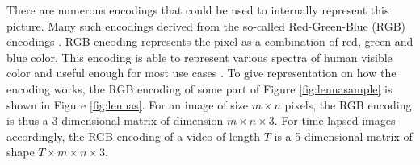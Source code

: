 \documentclass[pdftex,12pt,a4paper]{report}
\begin{document}
There are numerous encodings that could be used to internally represent this picture. Many such encodings derived from the so-called Red-Green-Blue (RGB) encodings \cite{sonka2014image}. RGB encoding represents the pixel as a combination of red, green and blue color. This encoding is able to represent various spectra of human visible color and useful enough for most use cases \cite{sonka2014image, jayant1993signal}. To give representation on how the encoding works, the RGB encoding of some part of Figure \ref{fig:lennasample} is shown in Figure \ref{fig:lennas}. For an image of size $m \times n$ pixels, the RGB encoding is thus a 3-dimensional matrix of dimension $m \times n \times 3$. For time-lapsed images accordingly, the RGB encoding of a video of length $T$ is a 5-dimensional matrix of shape $T \times m \times n \times 3$. %

\end{document}
